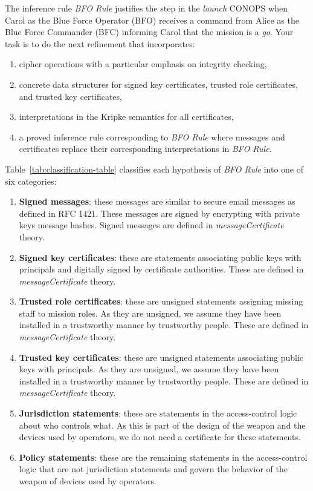 \message{ !name(secureMessages.tex)}\documentclass[10pt,twoside]{article}
\begin{document}
The inference rule \emph{BFO Rule} justifies the step in the
\emph{launch} CONOPS when Carol as the Blue Force Operator (BFO)
receives a command from Alice as the Blue Force Commander (BFC)
informing Carol that the mission is a \emph{go}. Your task is to do
the next refinement that incorporates:
\begin{enumerate}
\item cipher operations with a particular emphasis on integrity checking,
\item concrete data structures for signed key certificates, trusted
  role certificates, and trusted key certificates,
\item interpretations in the Kripke semantics for all certificates,
\item a proved inference rule corresponding to \emph{BFO Rule} where
  messages and certificates replace their corresponding
  interpretations in \emph{BFO Rule}.
\end{enumerate}

Table~\ref{tab:classification-table} classifies each hypothesis of
\emph{BFO Rule} into one of six categories:
\begin{enumerate}
\item \textbf{Signed messages}: these messages are similar to secure email
  messages as defined in RFC 1421. These messages are signed by
  encrypting with private keys message hashes. Signed messages are
  defined in \emph{messageCertificate} theory.
\item \textbf{Signed key certificates}: these are statements associating public
  keys with principals and digitally signed by certificate
  authorities. These are defined in \emph{messageCertificate} theory.
\item \textbf{Trusted role certificates}: these are unsigned
  statements assigning missing staff to mission roles. As they are
  unsigned, we assume they have been installed in a trustworthy manner
  by trustworthy people. These are defined in
  \emph{messageCertificate} theory.
\item \textbf{Trusted key certificates}: these are unsigned statements
  associating public keys with principals. As they are unsigned, we
  assume they have been installed in a trustworthy manner by
  trustworthy people. These are defined in \emph{messageCertificate}
  theory.
\item \textbf{Jurisdiction statements}: these are statements in the
  access-control logic about who controls what. As this is part of the
  design of the weapon and the devices used by operators, we do not
  need a certificate for these statements.
\item \textbf{Policy statements}: these are the remaining statements in
  the access-control logic that are not jurisdiction statements and
  govern the behavior of the weapon of devices used by operators.
\end{enumerate}
\end{document}
